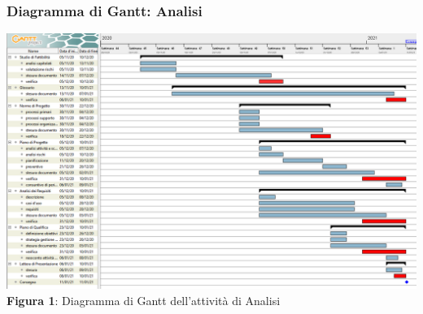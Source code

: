 \subsubsection{Diagramma di Gantt: Analisi}
\begin{center}
	\includegraphics[scale=0.45]{img/gant-analisi.PNG}
	\textbf{Figura 1}: Diagramma di Gantt dell'attività di Analisi
\end{center}